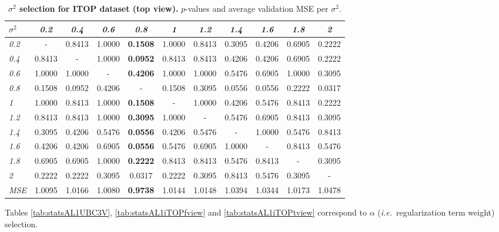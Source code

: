 \documentclass[review,12pt,3p]{elsarticle}
\def \ie{\textit{i.e.}}
\begin{document}
\begin{table}[t]
\caption{\textbf{$\sigma^2$ selection for ITOP dataset (top view).} $p$-values and average validation MSE per $\sigma^2$.}
\label{tab:statsS2iTOPtview}
\scriptsize %
\begin{center}
\setlength{\tabcolsep}{0.2em} %
\begin{tabular}{|l|c c c c c c c c c c |}
\hline
 $\sigma^2$ & \emph{0.2} & \emph{0.4}& \emph{0.6}& \emph{0.8}& \emph{1}& \emph{1.2}& \emph{1.4}& \emph{1.6}& \emph{1.8}& \emph{2} \\
\hline \emph{0.2} & - & 0.8413 & 1.0000 & \textbf{0.1508} & 1.0000 & 0.8413 & 0.3095 & 0.4206 & 0.6905 & 0.2222  \\
  \hline \emph{0.4} & 0.8413 & - & 1.0000 & \textbf{0.0952} & 0.8413 & 0.8413 & 0.4206 & 0.4206 & 0.6905 & 0.2222  \\
  \hline \emph{0.6} & 1.0000 & 1.0000 & - & \textbf{0.4206} & 1.0000 & 1.0000 & 0.5476 & 0.6905 & 1.0000 & 0.3095  \\
  \hline \emph{0.8} & 0.1508 & 0.0952 & 0.4206 & - & 0.1508 & 0.3095 & 0.0556 & 0.0556 & 0.2222 & 0.0317  \\
  \hline \emph{1} & 1.0000 & 0.8413 & 1.0000 & \textbf{0.1508} & - & 1.0000 & 0.4206 & 0.5476 & 0.8413 & 0.2222  \\
  \hline \emph{1.2} & 0.8413 & 0.8413 & 1.0000 & \textbf{0.3095} & 1.0000 & - & 0.5476 & 0.6905 & 0.8413 & 0.3095  \\
  \hline \emph{1.4} & 0.3095 & 0.4206 & 0.5476 & \textbf{0.0556} & 0.4206 & 0.5476 & - & 1.0000 & 0.5476 & 0.8413  \\
  \hline \emph{1.6} & 0.4206 & 0.4206 & 0.6905 & \textbf{0.0556} & 0.5476 & 0.6905 & 1.0000 & - & 0.8413 & 0.5476  \\
  \hline \emph{1.8} & 0.6905 & 0.6905 & 1.0000 & \textbf{0.2222} & 0.8413 & 0.8413 & 0.5476 & 0.8413 & - & 0.3095  \\
  \hline \emph{2} & 0.2222 & 0.2222 & 0.3095 & 0.0317 & 0.2222 & 0.3095 & 0.8413 & 0.5476 & 0.3095 & -  \\
\hline 
\hline
\textit{MSE} & 1.0095  &  1.0166  &  1.0080&    \textbf{0.9738}&    1.0144&    1.0148 &   1.0394    &1.0344 &   1.0173 &   1.0478\\
\hline
\end{tabular} 
\end{center}
\end{table}

Tables \ref{tab:statsAL1UBC3V}, \ref{tab:statsAL1iTOPfview} and \ref{tab:statsAL1iTOPtview} correspond to $\alpha$ (\ie~regularization term weight) selection.
\end{document}
